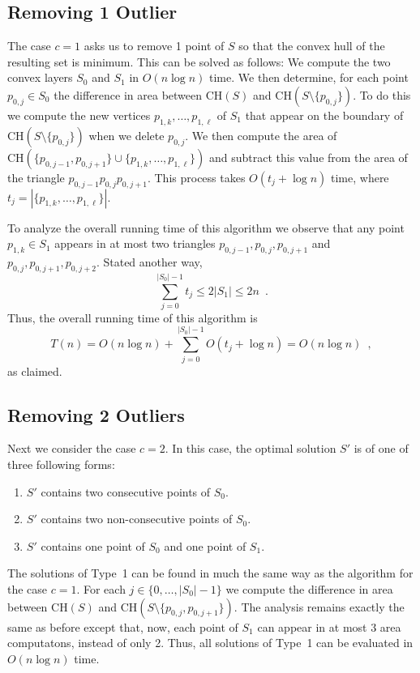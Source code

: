 \documentclass[lotsofwhite]{patmorin}
\newcommand{\ch}{\mathrm{CH}}
\begin{document}
\subsection{Removing 1 Outlier}

The case $c=1$ asks us to remove 1 point of $S$ so that the convex
hull of the resulting set is minimum.  This can be solved as follows:
We compute the two convex layers $S_0$ and $S_1$ in $O(n\log n)$ time.
We then determine, for each point $p_{0,j}\in S_0$ the difference in
area between $\ch(S)$ and $\ch(S\setminus\{p_{0,j}\})$.  To do this we
compute the new vertices $p_{1,k},\ldots,p_{1,\ell}$ of $S_1$ that
appear on the boundary of $\ch(S\setminus\{p_{0,j}\})$ when we delete
$p_{0,j}$.  We then compute the area of
$\ch(\{p_{0,j-1},p_{0,j+1}\}\cup\{p_{1,k},\ldots,p_{1,\ell}\})$ and
subtract this value from the area of the triangle
$p_{0,j-1}p_{0,j}p_{0,j+1}$.   This process takes $O(t_j+\log n)$
time, where $t_j=|\{p_{1,k},\ldots,p_{1,\ell}\}|$.

To analyze the overall running time of this algorithm we observe that
any point $p_{1,k}\in S_1$ appears in at most two triangles
$p_{0,j-1},p_{0,j},p_{0,j+1}$ and
$p_{0,j},p_{0,j+1},p_{0,j+2}$.  Stated another way,
\[
     \sum_{j=0}^{|S_0|-1} t_j \le 2|S_1|\le 2n \enspace .
\]
Thus, the overall running time of this algorithm is
\[
     T(n) = O(n\log n)+\sum_{j=0}^{|S_0|-1} O(t_j+\log n) = O(n\log n) \enspace ,
\]
as claimed.

\subsection{Removing 2 Outliers}

Next we consider the case $c=2$.  In this case, the optimal solution
$S'$ is of one of three following forms:

\begin{enumerate}
\item $S'$ contains two consecutive points of $S_0$.
\item $S'$ contains two non-consecutive points of $S_0$.
\item $S'$ contains one point of $S_0$ and one point of $S_1$.
\end{enumerate}

The solutions of Type~1 can be found in much the same way as the
algorithm for the case $c=1$.  For each $j\in\{0,\ldots,|S_0|-1\}$ we
compute the difference in area between $\ch(S)$ and
$\ch(S\setminus\{p_{0,j},p_{0,j+1}\})$.  The analysis remains exactly
the same as before except that, now, each point of $S_1$ can appear in
at most $3$ area computatons, instead of only 2.  Thus, all solutions
of Type~1 can be evaluated in $O(n\log n)$ time.
\end{document}
